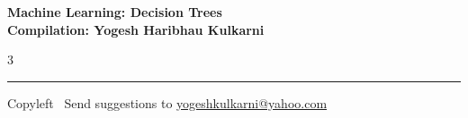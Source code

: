 \documentclass[8pt,landscape]{article}
\begin{document}
\footnotesize


\begin{center}
\Large{\textbf{Machine Learning: Decision Trees\\ Compilation: Yogesh Haribhau Kulkarni}}
\end{center}

\begin{multicols}{3}

\end{multicols}

\rule{\linewidth}{0.25pt}
\scriptsize
Copyleft \textcopyleft\  Send suggestions to
\href{http://www.yogeshkulkarni.com}{yogeshkulkarni@yahoo.com}
\end{document}
